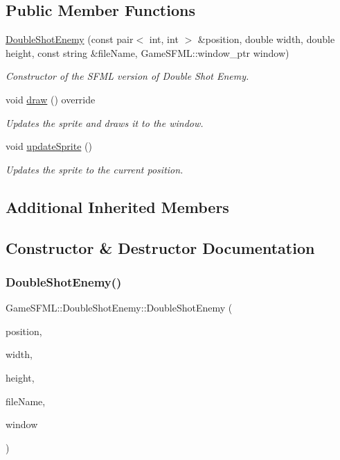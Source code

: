 \subsection*{Public Member Functions}
\begin{DoxyCompactItemize}
\item 
\hyperlink{classGameSFML_1_1DoubleShotEnemy_aac02c60e67312c1b15ccae83c4d2a4ea}{Double\+Shot\+Enemy} (const pair$<$ int, int $>$ \&position, double width, double height, const string \&file\+Name, Game\+S\+F\+M\+L\+::window\+\_\+ptr window)
\begin{DoxyCompactList}\small\item\em Constructor of the S\+F\+ML version of Double Shot Enemy. \end{DoxyCompactList}\item 
void \hyperlink{classGameSFML_1_1DoubleShotEnemy_a3d30aebbab50ad019207d6ba91ab0b5f}{draw} () override
\begin{DoxyCompactList}\small\item\em Updates the sprite and draws it to the window. \end{DoxyCompactList}\item 
void \hyperlink{classGameSFML_1_1DoubleShotEnemy_a9f93afa5fb33282829667f49f4fc48b9}{update\+Sprite} ()
\begin{DoxyCompactList}\small\item\em Updates the sprite to the current position. \end{DoxyCompactList}\end{DoxyCompactItemize}
\subsection*{Additional Inherited Members}


\subsection{Constructor \& Destructor Documentation}
\mbox{\label{classGameSFML_1_1DoubleShotEnemy_aac02c60e67312c1b15ccae83c4d2a4ea}} 
\subsubsection{\texorpdfstring{Double\+Shot\+Enemy()}{DoubleShotEnemy()}}
{\footnotesize\ttfamily Game\+S\+F\+M\+L\+::\+Double\+Shot\+Enemy\+::\+Double\+Shot\+Enemy (\begin{DoxyParamCaption}\item[{const pair$<$ int, int $>$ \&}]{position,  }\item[{double}]{width,  }\item[{double}]{height,  }\item[{const string \&}]{file\+Name,  }\item[{Game\+S\+F\+M\+L\+::window\+\_\+ptr}]{window }\end{DoxyParamCaption})}

